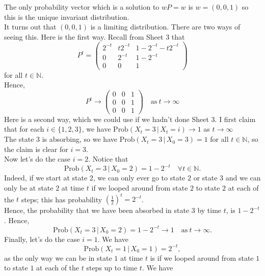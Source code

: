 \documentclass[11pt,a4paper]{article}
\begin{document}
\begin{enumerate}
\begin{enumerate}
            The only probability vector which is a solution to $wP = w$ is $w = (0, 0, 1)$  so this is the unique invariant distribution.\\
            It turns out that $(0, 0, 1)$ is a limiting distribution. There are two ways of seeing this. Here is the first way. Recall from Sheet 3 that
            $$
            P^t
            =
            \begin{pmatrix}
                2^{-t} & t2^{-t} & 1-2^{-t} - t2^{-t}\\
                0 & 2^{-t} & 1-2^{-t}\\
                0 & 0 & 1
            \end{pmatrix}
            $$
            for all $t \in \mathbb{N}$.\\
            Hence,
            $$
            P^t
            \to 
            \begin{pmatrix}
                0 & 0 & 1\\
                0 & 0 & 1\\
                0 & 0 & 1
            \end{pmatrix}
            \quad \text{as}\ t \to \infty
            $$
            Here is a second way, which we could use if we hadn't done Sheet 3. I first claim that for each $i \in \{ 1,2,3 \}$, we have $\text{Prob}(X_t = 3\, | \, X_t = i) \to 1$ as $t \to \infty$\\
            The state 3 is absorbing, so we have $\text{Prob}(X_t = 3\, | \, X_0 = 3) = 1$ for all $t \in \mathbb{N}$, so the claim is clear for $i = 3$.\\
            Now let's do the case $i = 2$. Notice that
            $$
            \text{Prob}(X_t = 3\, | \, X_0 = 2) = 1-2^{-t} \quad \forall t \in \mathbb{N}.
            $$
            Indeed, if we start at state $2$, we can only ever go to state $2$ or state $3$ and we can only be at state $2$ at time $t$ if we looped around from state $2$ to state $2$ at each of the $t$ steps; this has probability $(\frac{1}{2})^t = 2^{-t}$.\\
            Hence, the probability that we have been absorbed in state 3 by time $t$, is $1-2^{-t}$. Hence,
            $$
            \text{Prob}(X_t = 3\, | \, X_0 = 2) =1 - 2^{-t} \to 1 \quad \text{as}\ t \to \infty.
            $$
            Finally, let's do the case $i = 1$. We have
            $$
            \text{Prob}(X_t = 1\, | \, X_0 = 1) = 2^{-t},
            $$
            as the only way we can be in state $1$ at time $t$ is if we looped around from state $1$ to state $1$ at each of the $t$ steps up to time $t$. We have

\end{enumerate}
\end{enumerate}
\end{document}
